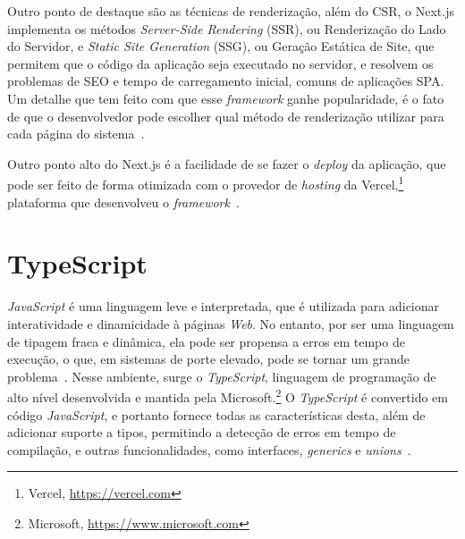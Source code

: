 Outro ponto de destaque são as técnicas de renderização, 
além do CSR, o Next.js implementa os métodos \textit{Server-Side Rendering} (SSR), ou Renderização do Lado do Servidor,
e \textit{Static Site Generation} (SSG), ou Geração Estática de Site, que permitem que o código da aplicação seja executado
no servidor, e resolvem os problemas de SEO e tempo de carregamento inicial, comuns de 
aplicações SPA. Um detalhe que tem feito com que esse \textit{framework}
ganhe popularidade, é o fato de que o desenvolvedor pode escolher qual método de renderização
utilizar para cada página do sistema~\cite{vercel:2023}.

Outro ponto alto do Next.js é a facilidade de se fazer o \textit{deploy} da aplicação, que pode ser feito
de forma otimizada com o provedor de \textit{hosting} da Vercel,\footnote{Vercel, \url{https://vercel.com}} 
plataforma que desenvolveu o \textit{framework}~\cite{nextjs:2023}.



\section{TypeScript}
\label{sec-fundteo-framework-ts}
\textit{JavaScript} é uma linguagem leve e interpretada, que é utilizada para adicionar interatividade e dinamicidade
à páginas \textit{Web}. No entanto, por ser uma linguagem de tipagem fraca e dinâmica, ela pode ser propensa a erros
em tempo de execução, o que, em sistemas de porte elevado, pode se tornar um grande problema~\cite{typescript:2024}.
Nesse ambiente, surge o \textit{TypeScript}, linguagem de programação de alto nível desenvolvida e mantida pela Microsoft.\footnote{Microsoft, \url{https://www.microsoft.com}}
O \textit{TypeScript} é convertido em código \textit{JavaScript}, e portanto fornece todas as características desta, além de adicionar suporte a tipos, 
permitindo a detecção de erros em tempo de compilação,
e outras funcionalidades, como interfaces, \textit{generics} e \textit{unions}~\cite{typescript:2024}.


